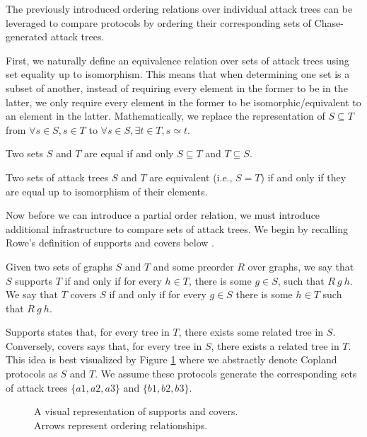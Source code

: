 \documentclass[runningheads]{llncs}
\theoremstyle{definition}
\begin{document}
The previously introduced ordering relations over individual attack trees can be leveraged to compare protocols by ordering their corresponding sets of Chase-generated attack trees. 

First, we naturally define an equivalence relation over sets of attack trees using set equality up to isomorphism. This means that when determining one set is a subset of another, instead of requiring every element in the former to be in the latter, we only require every element in the former to be isomorphic/equivalent to an element in the latter. Mathematically, we replace the representation of $S \subseteq T$ from $\forall s \in S, s \in T$ to $\forall s \in S, \exists t \in T, s \simeq t$.

\begin{definition}
  Two sets $S$ and $T$ are equal if and only $S \subseteq T$ and $T \subseteq S$.
\end{definition}

\begin{definition}[Equivalence =]
    Two sets of attack trees $S$ and $T$ are equivalent (i.e., $S = T$) if and only if they are equal up to isomorphism of their elements.
\end{definition}

Now before we can introduce a partial order relation, we must introduce additional infrastructure to compare sets of attack trees. We begin by recalling Rowe's definition of supports and covers below \cite{Rowe:2021:OnOrdering}.

\begin{definition}
    Given two sets of graphs $S$ and $T$ and some preorder $R$ over graphs, we say that $S$ supports $T$ if and only if for every $h \in T$, there is some $g \in S$, such that $R\: g\: h$. We  say that $T$ covers $S$ if and only if for every $g \in S$ there is some $h \in T$ such that $R\: g\: h$.
\end{definition}

Supports states that, for every tree in $T$, there exists some related tree in $S$. Conversely, covers says that, for every tree in $S$, there exists a related tree in $T$.  This idea is best visualized by Figure \ref{fig:sup-cov} where we abstractly denote Copland protocols as $S$ and $T$. We assume these protocols generate the corresponding sets of attack trees $\{a1, a2 , a3 \}$ and $ \{b1, b2 ,b3\}$.

\begin{figure}[htbp]
    \centering
    
    \captionsetup{justification=centering,margin=1cm}
    \caption[Supports and covers]{A visual representation of supports and covers. \\ Arrows represent ordering relationships.}
    \label{fig:sup-cov}
\end{figure}
\end{document}
